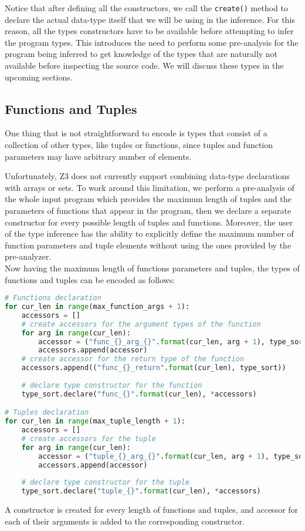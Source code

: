 Notice that after defining all the constructors, we call the \lstinline|create()| method to declare the actual data-type itself that we will be using in the inference. For this reason, all the types constructors have to be available before attempting to infer the program types. This introduces the need to perform some pre-analysis for the program being inferred to get knowledge of the types that are naturally not available before inspecting the source code. We will discuss these types in the upcoming sections.

\subsection{Functions and Tuples}
One thing that is not straightforward to encode is types that consist of a collection of other types, like tuples or functions, since tuples and function parameters may have arbitrary number of elements.

Unfortunately, Z3 does not currently support combining data-type declarations with arrays or sets. To work around this limitation, we perform a pre-analysis of the whole input program which provides the maximum length of tuples and the parameters of functions that appear in the program, then we declare a separate constructor for every possible length of tuples and functions. Moreover, the user of the type inference has the ability to explicitly define the maximum number of function parameters and tuple elements without using the ones provided by the pre-analyzer.\\

Now having the maximum length of functions parameters and tuples, the types of functions and tuples can be encoded as follows:

\begin{lstlisting}[language=python]
# Functions declaration
for cur_len in range(max_function_args + 1):
    accessors = []
    # create accessors for the argument types of the function
    for arg in range(cur_len):
	    accessor = ("func_{}_arg_{}".format(cur_len, arg + 1), type_sort)
	    accessors.append(accessor)
    # create accessor for the return type of the function
    accessors.append(("func_{}_return".format(cur_len), type_sort))
    
    # declare type constructor for the function
    type_sort.declare("func_{}".format(cur_len), *accessors)

# Tuples declaration
for cur_len in range(max_tuple_length + 1):
    accessors = []
    # create accessors for the tuple
    for arg in range(cur_len):
		accessor = ("tuple_{}_arg_{}".format(cur_len, arg + 1), type_sort)
	    accessors.append(accessor)
	    
    # declare type constructor for the tuple
    type_sort.declare("tuple_{}".format(cur_len), *accessors)
\end{lstlisting}
A constructor is created for every length of functions and tuples, and accessor for each of their arguments is added to the corresponding constructor.

